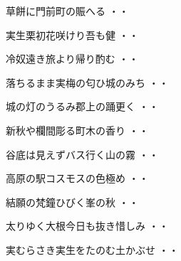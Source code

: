 \vspace{0.6cm}
\begin{shiika}草餅に門前町の賑へる
\hfill{・・}\end{shiika}
\vspace{0.6cm}
\begin{shiika}実生栗初花咲けり吾も健
\hfill{・・}\end{shiika}
\vspace{0.6cm}
\begin{shiika}冷奴遠き旅より帰り酌む
\hfill{・・}\end{shiika}
\vspace{0.6cm}
\begin{shiika}落ちるまま実梅の匂ひ城のみち
\hfill{・・}\end{shiika}
\vspace{0.6cm}
\begin{shiika}城の灯のうるみ郡上の踊更く
\hfill{・・}\end{shiika}
\vspace{0.6cm}
\begin{shiika}新秋や欄間彫る町木の香り
\hfill{・・}\end{shiika}
\vspace{0.6cm}
\begin{shiika}谷底は見えずバス行く山の霧
\hfill{・・}\end{shiika}
\vspace{0.6cm}
\begin{shiika}高原の駅コスモスの色極め
\hfill{・・}\end{shiika}
\vspace{0.6cm}
\begin{shiika}結願の梵鐘ひびく峯の秋
\hfill{・・}\end{shiika}
\vspace{0.6cm}
\begin{shiika}太りゆく大根今日も抜き惜しみ
\hfill{・・}\end{shiika}
\vspace{0.6cm}
\begin{shiika}実むらさき実生をたのむ土かぶせ
\hfill{・・}\end{shiika}
